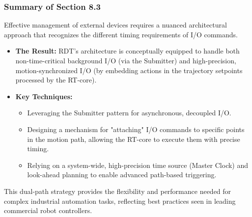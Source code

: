 \subsubsection{Summary of Section 8.3}
\label{subsubsec:section8_3_summary}
Effective management of external devices requires a nuanced architectural approach that recognizes the different timing requirements of I/O commands.
\begin{itemize}
    \item \textbf{The Result:} RDT's architecture is conceptually equipped to handle both non-time-critical background I/O (via the Submitter) and high-precision, motion-synchronized I/O (by embedding actions in the trajectory setpoints processed by the RT-core).
    \item \textbf{Key Techniques:}
    \begin{itemize}
        \item Leveraging the Submitter pattern for asynchronous, decoupled I/O.
        \item Designing a mechanism for "attaching" I/O commands to specific points in the motion path, allowing the RT-core to execute them with precise timing.
        \item Relying on a system-wide, high-precision time source (Master Clock) and look-ahead planning to enable advanced path-based triggering.
    \end{itemize}
\end{itemize}
This dual-path strategy provides the flexibility and performance needed for complex industrial automation tasks, reflecting best practices seen in leading commercial robot controllers.

